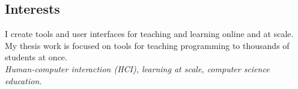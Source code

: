 \documentclass[margin]{res}
\begin{document}
 

 
\address{32 Vassar Street, Rm 32-G707\\Cambridge, MA 02139}
\address{ELG@MIT.edu\\
(215) 694-9631} 

 
\begin{resume} 
 
\section{Interests} 
I create tools and user interfaces for teaching and learning online and at scale. My thesis work is focused on tools for teaching programming to thousands of students at once.\\
{\it Human-computer interaction (HCI), learning at scale, computer science education.}






\end{resume}
\end{document}
